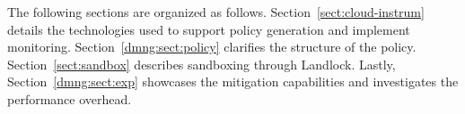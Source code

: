 The following sections are organized as
follows. Section~\ref{sect:cloud-instrum} details the technologies
used to support policy generation and implement
monitoring. Section~\ref{dmng:sect:policy} clarifies the structure of the
policy. Section~\ref{sect:sandbox} describes sandboxing through
Landlock. Lastly, Section~\ref{dmng:sect:exp} showcases the mitigation
capabilities and investigates the performance overhead.



